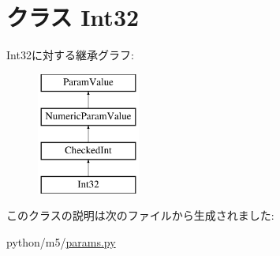 \hypertarget{classm5_1_1params_1_1Int32}{
\section{クラス Int32}
\label{classm5_1_1params_1_1Int32}
}
Int32に対する継承グラフ:\begin{figure}[H]
\begin{center}
\leavevmode
\includegraphics[height=4cm]{classm5_1_1params_1_1Int32}
\end{center}
\end{figure}


このクラスの説明は次のファイルから生成されました:\begin{DoxyCompactItemize}
\item 
python/m5/\hyperlink{params_8py}{params.py}\end{DoxyCompactItemize}

